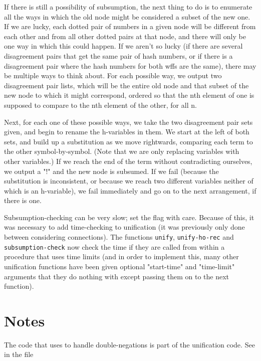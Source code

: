 If there is still a possibility of subsumption, the next thing to do is to enumerate all the 
ways in which the old node might be considered a subset of the new one. If we are lucky, 
each dotted pair of numbers in a given node will be different from each other and from all other dotted pairs
at that node, and there will only be one way in which this could happen. If we aren't so lucky (if 
there are several disagreement pairs that get the same pair of hash numbers, or if there is a 
disagreement pair where the hash numbers for both wffs are the same), there may
be multiple ways to think about. For each possible way, we output two disagreement pair lists, which 
will be the entire old node and that subset of the new node to which it might correspond, ordered 
so that the nth element of one is supposed to compare to the nth element of the other, for all n.

Next, for each one of these possible ways, we take the two disagreement pair sets given, and begin
to rename the h-variables in them. We start at the left of both sets, and build up a substitution as we move rightwards,
comparing each term to the other symbol-by-symbol.
(Note that we are only replacing variables with other variables.) 
If we reach the end of the term without contradicting ourselves, we output a
"!" and the new node is subsumed. If we fail (because the substitution is inconsistent, or because we reach 
two different variables neither of which is an h-variable), we fail immediately
and go on to the next arrangement, if there is one.

Subsumption-checking can be very slow; set the flag  with care.
Because of this, it was necessary to add time-checking to unification (it was previously only 
done between considering connections). The functions {\tt unify}, {\tt unify-ho-rec} and
{\tt subsumption-check} now check the time if they are called from within a procedure that 
uses time limits (and in order to implement this, many other unification functions have 
been given optional "start-time" and "time-limit" arguments that they do nothing 
with except passing them on to the next function).

\section{Notes}

The code that \TPS uses to handle double-negations is part of the unification 
code. See  in the file 


